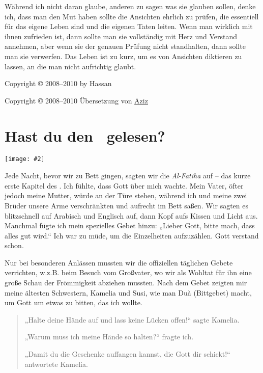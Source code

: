 \documentclass[12pt]{memoir}
\newcommand{\img}[3]{\begin{center}%
\texttt{[image: \#2]}\\{\small\em#3}%
\end{center}}
\begin{document}
Während ich nicht daran glaube, anderen zu sagen was sie glauben sollen,
denke ich, dass man den Mut haben sollte die Ansichten ehrlich zu prüfen,
die essentiell für das eigene Leben sind und die eigenen Taten leiten.
Wenn man wirklich mit ihnen zufrieden ist,
dann sollte man sie vollständig mit Herz und Verstand annehmen,
aber wenn sie der genauen Prüfung nicht standhalten,
dann sollte man sie verwerfen.
Das Leben ist zu kurz, um es von Ansichten diktieren zu lassen,
an die man nicht aufrichtig glaubt.

\hfill Copyright © 2008–2010 by Hassan

\hfill Copyright © 2008–2010 Übersetzung von
\href{mailto:alsana.aziz@gmail.com}{Aziz}

\mainmatter


\chapter{Hast du den \Quran\ gelesen?}

\img{scale=0.7}{Baby_Hassan.jpg}{}

Jede Nacht, bevor wir zu Bett gingen, sagten wir die \emph{Al-Fatiha} auf –
das kurze erste Kapitel des \Quran.
Ich fühlte, dass Gott über mich wachte.
Mein Vater, öfter jedoch meine Mutter, würde an der Türe stehen,
während ich und meine zwei Brüder unsere Arme verschränkten
und aufrecht im Bett saßen.
Wir sagten es blitzschnell auf Arabisch und Englisch auf,
dann Kopf aufs Kissen und Licht aus.
Manchmal fügte ich mein spezielles Gebet hinzu:
„Lieber Gott, bitte mach, dass alles gut wird.“
Ich war zu müde, um die Einzelheiten aufzuzählen.
Gott verstand schon.

Nur bei besonderen Anlässen mussten wir
die offiziellen täglichen Gebete verrichten,
w.z.B. beim Besuch vom Großvater,
wo wir als Wohltat für ihn eine große Schau der Frömmigkeit abziehen mussten.
Nach dem Gebet zeigten mir meine ältesten Schwestern, Kamelia und Susi,
wie man Du\`a (Bittgebet) macht, um Gott um etwas zu bitten, das ich wollte.

\begin{quote}
„Halte deine Hände auf und lass keine Lücken offen!“ sagte Kamelia.

„Warum muss ich meine Hände so halten?“ fragte ich.

„Damit du die Geschenke auffangen kannst, die Gott dir schickt!“
antwortete Kamelia.
\end{quote}
\end{document}
